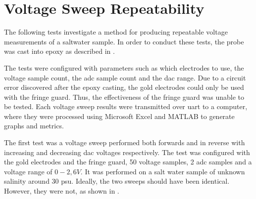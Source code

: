 \section{Voltage Sweep Repeatability}\label{sec:voltage-sweep-repeatability}

The following tests investigate a method for producing repeatable voltage measurements of a saltwater sample.
In order to conduct these tests, the probe was cast into epoxy as described in .

The tests were configured with parameters such as which electrodes to use, the voltage sample count, the \gls{adc} sample count and the \gls{dac} range.
Due to a circuit error discovered after the epoxy casting, the gold electrodes could only be used with the fringe guard.
Thus, the effectiveness of the fringe guard was unable to be tested.
Each voltage sweep results were transmitted over \gls{uart} to a computer, where they were processed using Microsoft Excel and MATLAB to generate graphs and metrics.

The first test was a voltage sweep performed both forwards and in reverse with increasing and decreasing \gls{dac} voltages respectively.
The test was configured with the gold electrodes and the fringe guard, 50 voltage samples, 2 \gls{adc} samples and a voltage range of $0-2,6V$.
It was performed on a salt water sample of unknown salinity around 30 \gls{psu}.
Ideally, the two sweeps should have been identical.
However, they were not, as shown in .

